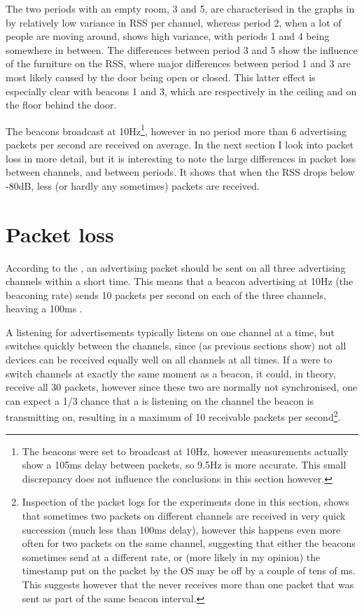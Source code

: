 The two periods with an empty room, 3 and 5, are characterised in the graphs in  by relatively low variance in RSS per channel, whereas period 2, when a lot of people are moving around, shows high variance, with periods 1 and 4 being somewhere in between.
The differences between period 3 and 5 show the influence of the furniture on the RSS, where major differences between period 1 and 3 are most likely caused by the door being open or closed.
This latter effect is especially clear with beacons 1 and 3, which are respectively in the ceiling and on the floor behind the door.

The beacons broadcast at 10Hz\footnote{The beacons were set to broadcast at 10Hz, however measurements actually show a 105ms delay between packets, so 9.5Hz is more accurate. This small discrepancy does not influence the conclusions in this section however.}, however in no period more than 6 advertising packets per second are received on average.
In the next section I look into packet loss in more detail, but it is interesting to note the large differences in packet loss between channels, and between periods.
It shows that when the RSS drops below -80dB, less (or hardly any sometimes) packets are received.

\section{Packet loss}
\label{sec:rss-packet-loss}
According to the \BTspec, an advertising packet should be sent on all three advertising channels within a short time.
This means that a beacon advertising at 10Hz (the beaconing rate) sends 10 packets per second on each of the three channels, heaving a 100ms .

A \device listening for advertisements typically listens on one channel at a time, but switches quickly between the channels, since (as previous sections show) not all devices can be received equally well on all channels at all times.
If a \device were to switch channels at exactly the same moment as a beacon, it could, in theory, receive all 30 packets, however since these two are normally not synchronised, one can expect a 1/3 chance that a \device is listening on the channel the beacon is transmitting on, resulting in a maximum of 10 receivable packets per second\footnote{Inspection of the packet logs for the experiments done in this section, shows that sometimes two packets on different channels are received in very quick succession (much less than 100ms delay), however this happens even more often for two packets on the same channel, suggesting that either the beacons sometimes send at a different rate, or (more likely in my opinion) the timestamp put on the packet by the OS may be off by a couple of tens of ms. This suggests however that the \device never receives more than one packet that was sent as part of the same beacon interval.}.

